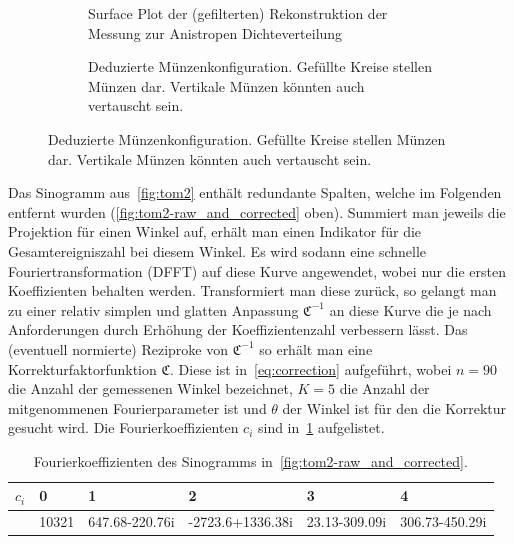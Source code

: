 \documentclass[slug=PET, room=Andreas-Schubert-Bau\,\ 424A, supervisor=Carsten\ Bittrich, coursedate=10.\ 01.\ 2020]{../../Lab_Report_LaTeX/lab_report}
\begin{document}
\begin{figure}[h]
 \centering
 \begin{subfigure}{.4\textwidth}
   \centering
   \resizebox{0.8\textwidth}{!}{
     
   }
   \caption{Surface Plot der (gefilterten) Rekonstruktion der Messung zur Anistropen Dichteverteilung}
   \label{fig:tom2-3dplot}
 \end{subfigure}
 \begin{subfigure}{.4\textwidth}
   \centering
   \caption[M\"unzkonfiguration]{Deduzierte
     M\"unzenkonfiguration. Gef\"ullte Kreise stellen M\"unzen
     dar. Vertikale M\"unzen k\"onnten auch vertauscht sein.}
   \label{fig:munzen}
 \end{subfigure}
\end{figure}


Das Sinogramm aus~\ref{fig:tom2} enth\"alt redundante Spalten, welche
im Folgenden entfernt wurden (\ref{fig:tom2-raw_and_corrected}
oben). Summiert man jeweils die Projektion f\"ur einen Winkel auf,
erh\"alt man einen Indikator f\"ur die Gesamtereigniszahl bei diesem
Winkel. Es wird sodann eine schnelle Fouriertransformation (DFFT) auf
diese Kurve angewendet, wobei nur die ersten Koeffizienten behalten
werden. Transformiert man diese zur\"uck, so gelangt man zu einer
relativ simplen und glatten Anpassung \(\mathfrak{C}^{-1}\) an diese
Kurve die je nach Anforderungen durch Erh\"ohung der
Koeffizientenzahl verbessern l\"asst. Das (eventuell normierte)
Reziproke von \(\mathfrak{C}^{-1}\) so erh\"alt man eine
Korrekturfaktorfunktion \(\mathfrak{C}\). Diese ist
in~\eqref{eq:correction} aufgef\"uhrt, wobei \(n=90\) die Anzahl der
gemessenen Winkel bezeichnet, \(K=5\) die Anzahl der mitgenommenen
Fourierparameter ist und \(\theta\) der Winkel ist f\"ur den die
Korrektur gesucht wird. Die Fourierkoeffizienten \(c_i\) sind
in~\ref{tab:coeff} aufgelistet.

\begin{table}[h]
  \centering
  \begin{tabular}{l|lllll}
    \toprule
    \(c_i\) & 0 & 1 & 2 & 3 & 4 \\
    \midrule
            & 10321 & 647.68-220.76i & -2723.6+1336.38i & 23.13-309.09i & 306.73-450.29i
  \end{tabular}
  \caption{Fourierkoeffizienten des Sinogramms in~\ref{fig:tom2-raw_and_corrected}.}
  \label{tab:coeff}
\end{table}
\end{document}
